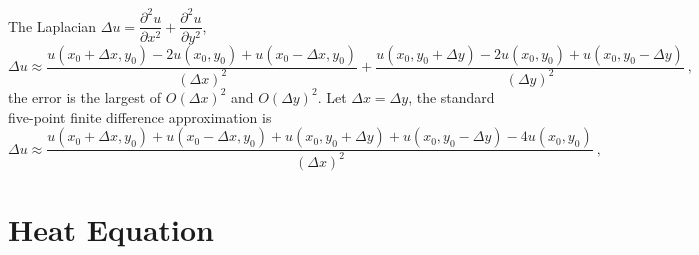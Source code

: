 \documentclass[12pt,a4paper]{article}
\begin{document}
The Laplacian $\Delta u = \dfrac{\partial^2 u}{\partial x^2} +\dfrac{\partial^2 u}{\partial y^2}$,
\begin{equation}
\Delta u \approx  \frac{u(x_0 +\Delta x, y_0) -2u(x_0, y_0) + u(x_0 -\Delta x, y_0)}{(\Delta x)^2} +\frac{u(x_0, y_0+\Delta y) -2u(x_0, y_0) + u(x_0 , y_0-\Delta y)}{(\Delta y)^2} ~,
\end{equation}
the error is the largest of $O(\Delta x)^2$ and $O(\Delta y)^2$. Let $\Delta x =\Delta y$, the standard five-point finite difference approximation is
\begin{equation}
\Delta u \approx  \frac{u(x_0 +\Delta x, y_0) + u(x_0 -\Delta x, y_0) +u(x_0, y_0+\Delta y) + u(x_0 , y_0-\Delta y) -4u(x_0, y_0)}{(\Delta x)^2} ~,
\end{equation}



\section{Heat Equation}
\end{document}
